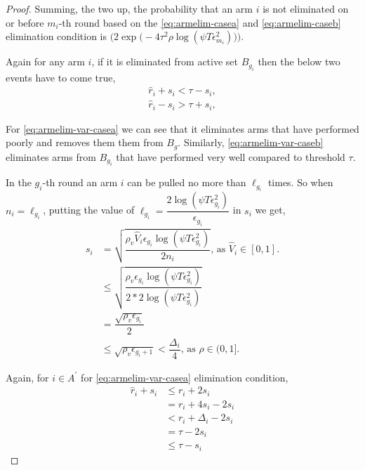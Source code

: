 \begin{proof}
Summing, the two up, the probability that an arm ${i}$ is not eliminated on or before $m_{i}$-th round based on the \ref{eq:armelim-casea} and \ref{eq:armelim-caseb} elimination condition is  $\bigg(2\exp\big(-4\tau^{2}\rho\log (\psi T\epsilon_{m_{i}}^{2})\big)\bigg)$. 


Again for any arm $i$, if it is eliminated from active set $B_{g_{i}}$ then the below two events have to come true,
\begin{align}
\hat{r}_{i} + s_{i} < \tau - s_{i}, \label{eq:armelim-var-casea}\\
\hat{r}_{i} - s_{i} > \tau + s_{i}, \label{eq:armelim-var-caseb}
\end{align}

For \ref{eq:armelim-var-casea} we can see that it eliminates arms that have performed poorly and removes them them from $B_{g}$. Similarly, \ref{eq:armelim-var-caseb} eliminates arms from $B_{g_{i}}$ that have performed very well compared to threshold $\tau$.


In the $g_{i}$-th round an arm $i$ can be pulled no more than $\ell_{g_{i}}$ times. So when $n_{i}=\ell_{g_{i}}$, putting the value of $\ell_{g_{i}}=\dfrac{2\log{(\psi T\epsilon_{g_{i}}^{2})}}{\epsilon_{g_{i}}}$ in $s_{i}$ we get, 
\begin{align*}
s_{i}&=\sqrt{\dfrac{\rho_v \hat{V}_{i} \epsilon_{g_{i}}\log (\psi T\epsilon_{g_{i}}^{2})}{2 n_{i}}} \text{, as }\hat{V}_{i}\in [0,1].\\
&\leq \sqrt{\dfrac{\rho_v \epsilon_{g_{i}}\log (\psi T\epsilon_{g_{i}}^{2})}{2*2 \log(\psi T\epsilon_{g_{i}}^{2})}}\\
& =\dfrac{\sqrt{\rho_v \epsilon_{g_{i}}}}{2}\\
& \leq \sqrt{\rho_v \epsilon_{g_{i}+1}} < \dfrac{\Delta_{i}}{4} \text{, as }\rho\in (0,1].
\end{align*}

Again, for ${i} \in A^{'}$ for \ref{eq:armelim-var-casea} elimination condition, 
\begin{align*}
\hat{r}_{i} + s_{i}&\leq r_{i} + 2s_{i} \\
&= r_{i} + 4s_{i} - 2s_{i} \\
&< r_{i} + \Delta_{i} - 2s_{i}\\
&= \tau -2s_{i} \\
&\leq \tau - s_{i}
\end{align*}


\end{proof}
